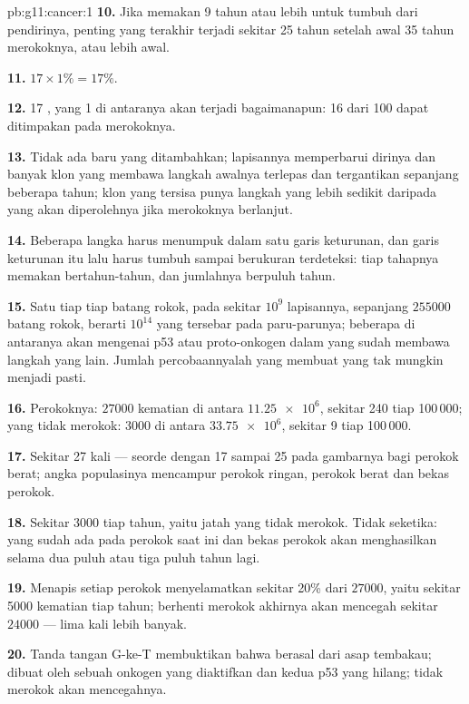 \begin{solution}{pb:g11:cancer:1}
\textbf{10.} Jika  memakan 9 tahun atau lebih untuk tumbuh dari
 pendirinya,  penting yang terakhir terjadi sekitar 25 tahun
setelah awal 35 tahun merokoknya, atau lebih awal.

\textbf{11.} $17 \times 1\% = 17\%$.

\textbf{12.} 17 , yang 1 di antaranya akan terjadi bagaimanapun:
16 dari 100 dapat ditimpakan pada merokoknya.

\textbf{13.} Tidak ada  baru yang ditambahkan; lapisannya
memperbarui dirinya dan banyak klon yang membawa langkah awalnya
terlepas dan tergantikan sepanjang beberapa tahun; klon yang tersisa
punya langkah yang lebih sedikit daripada yang akan diperolehnya jika
merokoknya berlanjut.

\textbf{14.} Beberapa  langka harus menumpuk dalam satu garis
keturunan, dan garis keturunan itu lalu harus tumbuh sampai berukuran
terdeteksi: tiap tahapnya memakan bertahun-tahun, dan jumlahnya
berpuluh tahun.

\textbf{15.} Satu  tiap  tiap batang rokok, pada sekitar
$10^9$  lapisannya, sepanjang $\num{255000}$ batang rokok, berarti
$10^{14}$  yang tersebar pada paru-parunya; beberapa di antaranya
akan mengenai p53 atau proto-onkogen dalam  yang sudah membawa
langkah yang lain. Jumlah percobaannyalah yang membuat yang tak mungkin
menjadi pasti.

\textbf{16.} Perokoknya: $\num{27000}$ kematian di antara
$\num{11.25e6}$, sekitar 240 tiap 100\,000; yang tidak merokok: 3000 di
antara $\num{33.75e6}$, sekitar 9 tiap 100\,000.

\textbf{17.} Sekitar 27 kali --- seorde dengan 17 sampai 25 pada
gambarnya bagi perokok berat; angka populasinya mencampur perokok
ringan, perokok berat dan bekas perokok.

\textbf{18.} Sekitar 3000 tiap tahun, yaitu jatah yang tidak merokok.
Tidak seketika:  yang sudah ada pada perokok saat ini dan bekas
perokok akan menghasilkan  selama dua puluh atau tiga puluh tahun lagi.

\textbf{19.} Menapis setiap perokok menyelamatkan sekitar 20\% dari
$\num{27000}$, yaitu sekitar 5000 kematian tiap tahun; berhenti merokok
akhirnya akan mencegah sekitar $\num{24000}$ --- lima kali lebih banyak.

\textbf{20.} Tanda tangan G-ke-T membuktikan bahwa  
berasal dari asap tembakau;  dibuat oleh sebuah onkogen yang
diaktifkan dan kedua  p53 yang hilang; tidak merokok akan mencegahnya.
\end{solution}
